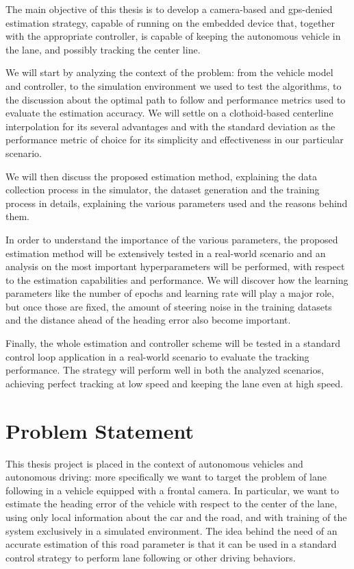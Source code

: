 \documentclass[a4paper,12pt,sort&compress]{article}
\begin{document}
    The main objective of this thesis is to develop a camera-based and gps-denied estimation strategy, capable of running on
    the embedded device that, together with the appropriate controller, is capable
    of keeping the autonomous vehicle in the lane, and possibly tracking the center line. 

    We will start by analyzing the context of the problem: from the vehicle model and controller, to the simulation environment we
    used to test the algorithms, to the discussion about the optimal path to follow and performance
    metrics used to evaluate the estimation accuracy. We will settle on a clothoid-based centerline
    interpolation for its several advantages and with the standard deviation as the performance
    metric of choice for its simplicity and effectiveness in our particular scenario.

    We will then discuss the proposed estimation method, explaining the data collection process in
    the simulator, the dataset generation and the training process in details, explaining the
    various parameters used and the reasons behind them. 

    In order to understand the importance of the various parameters, 
    the proposed estimation method will be extensively tested in a real-world scenario and an
    analysis on the most important hyperparameters will be performed, with respect to the estimation
    capabilities and performance. We will discover how the learning parameters like the number of
    epochs and learning rate will play a major role, but once those are fixed, the amount of
    steering noise in the training datasets and the distance ahead of the heading error also become
    important. 

    Finally, the whole estimation and controller scheme will be tested in a standard control loop
    application in a real-world scenario to evaluate the tracking performance. The strategy will perform
    well in both the analyzed scenarios, achieving perfect tracking at low speed and keeping the
    lane even at high speed.

    \newpage


\section{Problem Statement}
    This thesis project is placed in the context of autonomous vehicles and
    autonomous driving: more specifically we want to target the problem of lane
    following in a vehicle equipped with a frontal camera. In particular, we
    want to estimate the heading error of the vehicle with respect to the center
    of the lane, using only
    local information about the car and the road, and with training of the system exclusively in a simulated environment. The idea behind the need of an
    accurate estimation of this road parameter is that it can be used in a
    standard control strategy to perform lane following or other driving
    behaviors.
\end{document}
